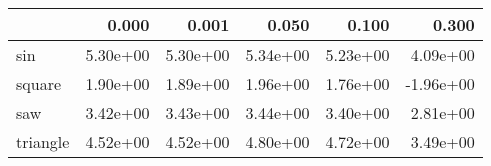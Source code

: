 \begin{tabular}{lrrrrr}
\toprule
{} &    0.000 &    0.001 &    0.050 &    0.100 &     0.300 \\
\midrule
sin      & 5.30e+00 & 5.30e+00 & 5.34e+00 & 5.23e+00 &  4.09e+00 \\
square   & 1.90e+00 & 1.89e+00 & 1.96e+00 & 1.76e+00 & -1.96e+00 \\
saw      & 3.42e+00 & 3.43e+00 & 3.44e+00 & 3.40e+00 &  2.81e+00 \\
triangle & 4.52e+00 & 4.52e+00 & 4.80e+00 & 4.72e+00 &  3.49e+00 \\
\bottomrule
\end{tabular}
